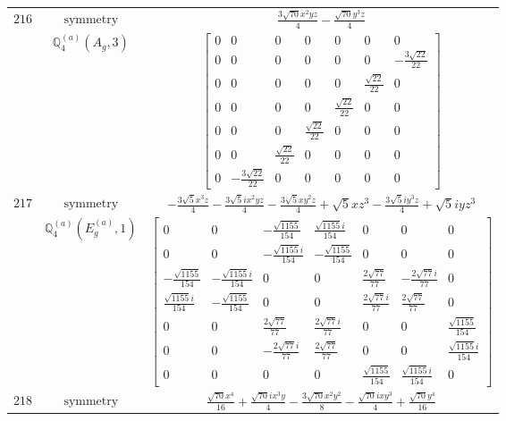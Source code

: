 \documentclass[fleqn,8pt,landscape]{jsarticle}
\begin{document}
\begin{longtable}{ccc}
$ 216 $ & $ \text{symmetry} $ & $ \frac{3 \sqrt{70} x^{2} y z}{4} - \frac{\sqrt{70} y^{3} z}{4} $ \\
$  $ & $ \mathbb{Q}_{4}^{(a)}(A_{g},3) $ & $ \begin{bmatrix} 0 & 0 & 0 & 0 & 0 & 0 & 0 \\ 0 & 0 & 0 & 0 & 0 & 0 & - \frac{3 \sqrt{22}}{22} \\ 0 & 0 & 0 & 0 & 0 & \frac{\sqrt{22}}{22} & 0 \\ 0 & 0 & 0 & 0 & \frac{\sqrt{22}}{22} & 0 & 0 \\ 0 & 0 & 0 & \frac{\sqrt{22}}{22} & 0 & 0 & 0 \\ 0 & 0 & \frac{\sqrt{22}}{22} & 0 & 0 & 0 & 0 \\ 0 & - \frac{3 \sqrt{22}}{22} & 0 & 0 & 0 & 0 & 0 \end{bmatrix} $ \\ \hline
$ 217 $ & $ \text{symmetry} $ & $ - \frac{3 \sqrt{5} x^{3} z}{4} - \frac{3 \sqrt{5} i x^{2} y z}{4} - \frac{3 \sqrt{5} x y^{2} z}{4} + \sqrt{5} x z^{3} - \frac{3 \sqrt{5} i y^{3} z}{4} + \sqrt{5} i y z^{3} $ \\
$  $ & $ \mathbb{Q}_{4}^{(a)}(E_{g}^{(a)},1) $ & $ \begin{bmatrix} 0 & 0 & - \frac{\sqrt{1155}}{154} & \frac{\sqrt{1155} i}{154} & 0 & 0 & 0 \\ 0 & 0 & - \frac{\sqrt{1155} i}{154} & - \frac{\sqrt{1155}}{154} & 0 & 0 & 0 \\ - \frac{\sqrt{1155}}{154} & - \frac{\sqrt{1155} i}{154} & 0 & 0 & \frac{2 \sqrt{77}}{77} & - \frac{2 \sqrt{77} i}{77} & 0 \\ \frac{\sqrt{1155} i}{154} & - \frac{\sqrt{1155}}{154} & 0 & 0 & \frac{2 \sqrt{77} i}{77} & \frac{2 \sqrt{77}}{77} & 0 \\ 0 & 0 & \frac{2 \sqrt{77}}{77} & \frac{2 \sqrt{77} i}{77} & 0 & 0 & \frac{\sqrt{1155}}{154} \\ 0 & 0 & - \frac{2 \sqrt{77} i}{77} & \frac{2 \sqrt{77}}{77} & 0 & 0 & \frac{\sqrt{1155} i}{154} \\ 0 & 0 & 0 & 0 & \frac{\sqrt{1155}}{154} & \frac{\sqrt{1155} i}{154} & 0 \end{bmatrix} $ \\ \hline
$ 218 $ & $ \text{symmetry} $ & $ \frac{\sqrt{70} x^{4}}{16} + \frac{\sqrt{70} i x^{3} y}{4} - \frac{3 \sqrt{70} x^{2} y^{2}}{8} - \frac{\sqrt{70} i x y^{3}}{4} + \frac{\sqrt{70} y^{4}}{16} $ \\

\end{longtable}
\end{document}
